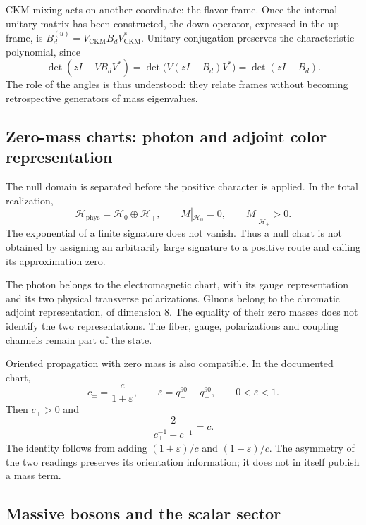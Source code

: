 CKM mixing acts on another coordinate: the flavor frame. Once
the internal unitary matrix has been constructed, the down operator, expressed
in the up frame, is \(B_d^{(u)}=V_{\mathrm{CKM}}B_dV_{\mathrm{CKM}}^*\).
Unitary conjugation preserves the characteristic polynomial, since
\[
 \det(zI-VB_dV^*)=\det\bigl(V(zI-B_d)V^*\bigr)=\det(zI-B_d).
\]
The role of the angles is thus understood: they relate frames without
becoming retrospective generators of mass eigenvalues.

\subsection{Zero-mass charts: photon and adjoint color representation}
\label{vi:vi:subsec:nulo-familias}

The null domain is separated before the positive character is applied. In the
total realization,
\[
 \mathcal H_{\mathrm{phys}}=\mathcal H_0\oplus\mathcal H_+,
 \qquad M|_{\mathcal H_0}=0,\qquad M|_{\mathcal H_+}>0.
\]
The exponential of a finite signature does not vanish. Thus a null chart
is not obtained by assigning an arbitrarily large signature to a positive
route and calling its approximation zero.

The photon belongs to the electromagnetic chart, with its gauge
representation and its two physical transverse polarizations. Gluons
belong to the chromatic adjoint representation, of dimension \(8\).
The equality of their zero masses does not identify the two representations.
The fiber, gauge, polarizations and coupling channels
remain part of the state.

Oriented propagation with zero mass is also compatible. In the
documented chart,
\[
 c_\pm=\frac{c}{1\pm\varepsilon},\qquad
 \varepsilon=q_-^{90}-q_+^{90},\qquad0<\varepsilon<1.
\]
Then \(c_\pm>0\) and
\[
 \frac{2}{c_+^{-1}+c_-^{-1}}=c.
\]
The identity follows from adding \((1+\varepsilon)/c\) and
\((1-\varepsilon)/c\). The asymmetry of the two readings preserves its
orientation information; it does not in itself publish a mass term.

\subsection{Massive bosons and the scalar sector}
\label{vi:vi:subsec:bosones-familias}

